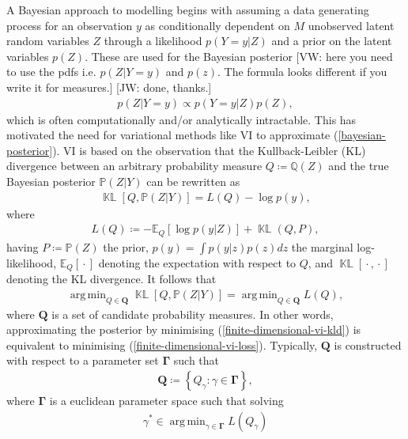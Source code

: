\documentclass{article}
\newcommand{\jw}[1]{{\color{gray} [JW: #1]}}
\newcommand{\vw}[1]{{\color{green} [VW: #1]}}
\newcommand{\KLD}{\operatorname{\mathbb{KL}}}
\newcommand{\wc}{\operatorname{{}\cdot{}}}
\DeclareMathOperator*{\argmin}{arg\,min}
\numberwithin{equation}{section}
\begin{document}
A Bayesian approach to modelling begins with assuming a data generating process for an observation $y$ as conditionally dependent on $M$ unobserved latent random variables $Z$ through a likelihood $p(Y=y\vert Z)$ and a prior on the latent variables $p(Z)$.
These are used for the Bayesian posterior \vw{here you need to use the pdfs i.e. $p(Z|Y=y)$ and $p(z)$. The formula looks different if you write it for measures.}\jw{done, thanks.}
\begin{align}
    p(Z \vert Y=y) \propto p(Y=y\vert Z)p(Z),
    \label{bayesian-posterior}
\end{align}
which is often computationally and/or analytically intractable.
This has motivated the need for variational methods like VI to approximate (\ref{bayesian-posterior}).
VI is based on the observation that the Kullback-Leibler (KL) divergence between an arbitrary probability measure $Q \coloneqq \mathbb{Q}(Z)$ and the true Bayesian posterior $\mathbb{P}(Z\vert Y)$ can be rewritten as
\begin{align}
    \KLD\left[Q, \mathbb{P}(Z \vert Y)\right] = L(Q) - \log p(y),
    \label{finite-dimensional-vi-kld}
\end{align}
where
\begin{align}
    L(Q) \coloneqq -\mathbb{E}_{Q}\left[\log p(y \vert Z)\right] + \KLD(Q, P),
    \label{finite-dimensional-vi-loss}
\end{align}
having $P \coloneqq \mathbb{P}(Z)$ the prior, $p(y) = \int p(y\vert z)p(z) dz$ the marginal log-likelihood, $\mathbb{E}_{Q}\left[\wc \right]$ denoting the expectation with respect to $Q$, and $\KLD\left[\wc, \wc\right]$ denoting the KL divergence.
It follows that
\begin{align}
    \argmin_{Q \in \boldsymbol{Q}} \KLD\left[Q, \mathbb{P}(Z\vert Y)\right] = \argmin_{Q \in \boldsymbol{Q}} L(Q),
    \label{optimal-approximation-vi}
\end{align}
where $\boldsymbol{Q}$ is a set of candidate probability measures.
In other words, approximating the posterior by minimising (\ref{finite-dimensional-vi-kld}) is equivalent to minimising (\ref{finite-dimensional-vi-loss}). Typically, $\boldsymbol{Q}$ is constructed with respect to a parameter set $\boldsymbol{\Gamma}$ such that
\begin{align}
    \boldsymbol{Q} \coloneqq \left\{Q_{\gamma}: \gamma \in \boldsymbol{\Gamma} \right\},
\end{align}
where $\boldsymbol{\Gamma}$ is a euclidean parameter space such that solving
\begin{align}
    \gamma^* \in \argmin_{\gamma \in \boldsymbol{\Gamma}} L(Q_{\gamma})
\end{align}
\end{document}

